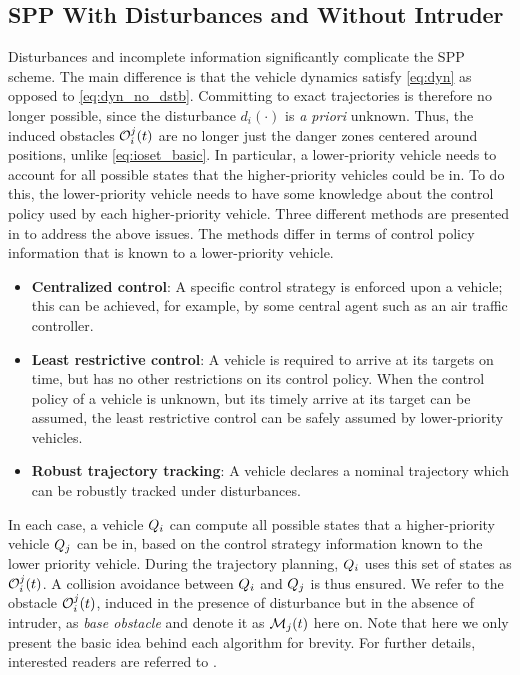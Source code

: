 \subsection{SPP With Disturbances and Without Intruder\label{sec:distb}}
Disturbances and incomplete information significantly complicate the SPP scheme. The main difference is that the vehicle dynamics satisfy \eqref{eq:dyn} as opposed to \eqref{eq:dyn_no_dstb}. Committing to exact trajectories is therefore no longer possible, since the disturbance $d_i(\cdot)$ is \textit{a priori} unknown. Thus, the induced obstacles $\mathcal{O}_i^j(t)$ are no longer just the danger zones centered around positions, unlike \eqref{eq:ioset_basic}. In particular, a lower-priority vehicle needs to account for all possible states that the higher-priority vehicles could be in. To do this, the lower-priority vehicle needs to have some knowledge about the control policy used by each higher-priority vehicle. Three different methods are presented in \cite{Bansal2017} to address the above issues. The methods differ in terms of control policy information that is known to a lower-priority vehicle.
\begin{itemize}
\item \textbf{Centralized control}: A specific control strategy is enforced upon a vehicle; this can be achieved, for example, by some central agent such as an air traffic controller. 
\item \textbf{Least restrictive control}: A vehicle is required to arrive at its targets on time, but has no other restrictions on its control policy. When the control policy of a vehicle is unknown, but its timely arrive at its target can be assumed, the least restrictive control can be safely assumed by lower-priority vehicles.
\item \textbf{Robust trajectory tracking}: A vehicle declares a nominal trajectory which can be robustly tracked under disturbances.
\end{itemize}
In each case, a vehicle $Q_i$ can compute all possible states that a higher-priority vehicle $Q_j$ can be in, based on the control strategy information known to the lower priority vehicle. During the trajectory planning, $Q_i$ uses this set of states as $\mathcal{O}_i^j(t)$. A collision avoidance between $Q_i$ and $Q_j$ is thus ensured. We refer to the obstacle $\mathcal{O}_i^j(t)$, induced in the presence of disturbance but in the absence of intruder, as \textit{base obstacle} and denote it as $\mathcal{M}_j(t)$ here on. Note that here we only present the basic idea behind each algorithm for brevity. For further details, interested readers are referred to \cite{Bansal2017}.
